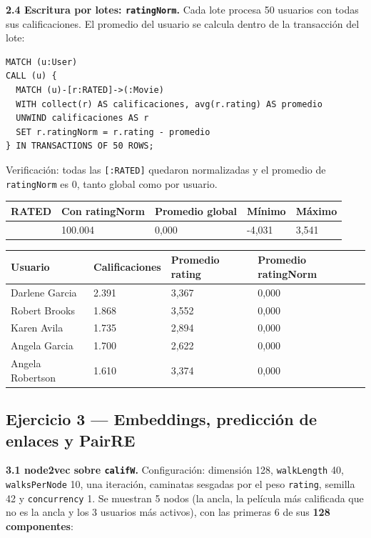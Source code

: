 \documentclass[
  spanish,
  10pt,
]{article}
\newcounter{none} %
\begin{document}
\textbf{2.4 Escritura por lotes: \texttt{ratingNorm}.} Cada lote procesa
50 usuarios con todas sus calificaciones. El promedio del usuario se
calcula dentro de la transacción del lote:

\begin{verbatim}
MATCH (u:User)
CALL (u) {
  MATCH (u)-[r:RATED]->(:Movie)
  WITH collect(r) AS calificaciones, avg(r.rating) AS promedio
  UNWIND calificaciones AS r
  SET r.ratingNorm = r.rating - promedio
} IN TRANSACTIONS OF 50 ROWS;
\end{verbatim}

Verificación: todas las \texttt{{[}:RATED{]}} quedaron normalizadas y el
promedio de \texttt{ratingNorm} es 0, tanto global como por usuario.

{\def\LTcaptype{none} %
\begin{longtable}[]{@{}lllll@{}}
\toprule\noalign{}
RATED & Con ratingNorm & Promedio global & Mínimo & Máximo \\
\midrule\noalign{}
\endhead
\bottomrule\noalign{}
\endlastfoot
100.004 & 100.004 & 0,000 & -4,031 & 3,541 \\
\end{longtable}
}

{\def\LTcaptype{none} %
\begin{longtable}[]{@{}llll@{}}
\toprule\noalign{}
Usuario & Calificaciones & Promedio rating & Promedio ratingNorm \\
\midrule\noalign{}
\endhead
\bottomrule\noalign{}
\endlastfoot
Darlene Garcia & 2.391 & 3,367 & 0,000 \\
Robert Brooks & 1.868 & 3,552 & 0,000 \\
Karen Avila & 1.735 & 2,894 & 0,000 \\
Angela Garcia & 1.700 & 2,622 & 0,000 \\
Angela Robertson & 1.610 & 3,374 & 0,000 \\
\end{longtable}
}

\subsection{Ejercicio 3 --- Embeddings, predicción de enlaces y
PairRE}\label{ejercicio-3-embeddings-predicciuxf3n-de-enlaces-y-pairre}

\textbf{3.1 node2vec sobre \texttt{califW}.} Configuración: dimensión
128, \texttt{walkLength} 40, \texttt{walksPerNode} 10, una iteración,
caminatas sesgadas por el peso \texttt{rating}, semilla 42 y
\texttt{concurrency} 1. Se muestran 5 nodos (la ancla, la película más
calificada que no es la ancla y los 3 usuarios más activos), con las
primeras 6 de sus \textbf{128 componentes}:
\end{document}
